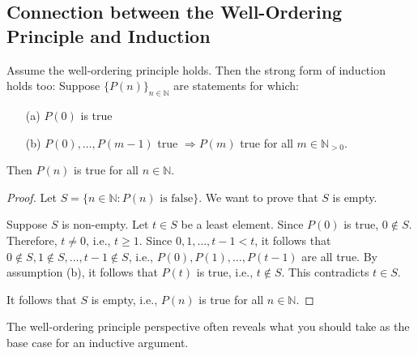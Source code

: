 \documentclass[11pt, draft]{article}
\begin{document}
\subsection{Connection between the Well-Ordering Principle and Induction}

\begin{theorem}

    Assume the well-ordering principle holds. Then the strong form of induction
    holds too: Suppose $\{P(n)\}_{n \in \mathbb{N}}$ are statements for which:

    \begin{itemize}
        \item[(a)] $P(0)$ is true
        \item[(b)] $P(0), \ldots, P(m-1)$ true $\Rightarrow P(m)$ true for all $m \in \mathbb{N}_{>0}$.
    \end{itemize}

    Then $P(n)$ is true for all $n \in \mathbb{N}$.
\end{theorem}
\begin{proof}
    Let $S = \{ n \in \mathbb{N} : P(n) \text{ is false} \}$. We want to prove that $S$ is empty.

    Suppose $S$ is non-empty. Let $t \in S$ be a least element. Since $P(0)$ is
    true, $0 \notin S$. Therefore, $t \neq 0$, i.e., $t \geq 1$. Since $0, 1,
        \ldots, t-1 < t$, it follows that $0 \notin S, 1 \notin S, \ldots, t-1 \notin
        S$, i.e., $P(0), P(1), \ldots, P(t-1)$ are all true. By assumption (b), it
    follows that $P(t)$ is true, i.e., $t \notin S$. This contradicts $t \in S$.

    It follows that $S$ is empty, i.e., $P(n)$ is true for all $n \in \mathbb{N}$.
\end{proof}
The well-ordering principle perspective often reveals what you should take as
the base case for an inductive argument.
\end{document}
